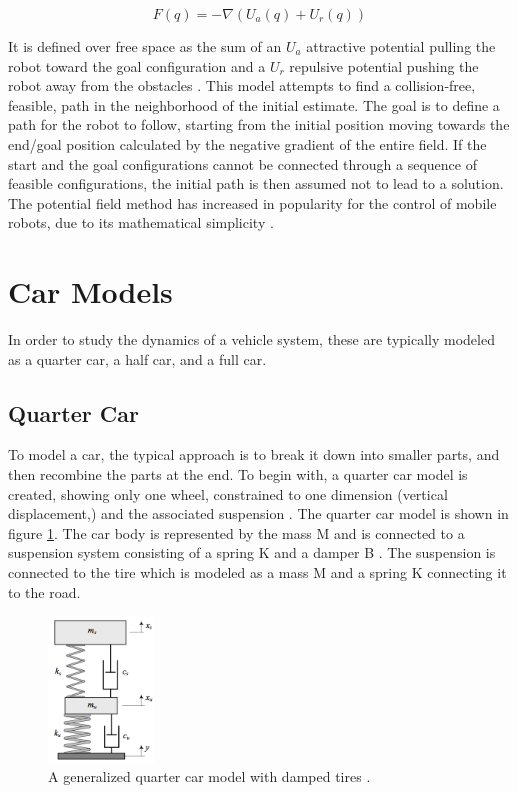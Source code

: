 $$F(q)=-\nabla(U_a(q)+U_r(q))$$

It is defined over free space as the sum of an $U_a$ attractive potential pulling the robot toward the goal configuration and a $U_r$ repulsive potential pushing the robot away from the obstacles \cite{article:potential_fields_convoy}. This model attempts to find a collision-free, feasible, path in the neighborhood of the initial estimate. The goal is to define a path for the robot to follow, starting from the initial position moving towards the end/goal position calculated by the negative gradient of the entire field. If the start and the goal configurations cannot be connected through a sequence of feasible configurations, the initial path is then assumed not to lead to a solution. The potential field method has increased in popularity for the control of mobile robots, due to its mathematical simplicity \cite{article:potential_fields_convoy}.

\section{Car Models}
In order to study the dynamics of a vehicle system, these are typically modeled as a quarter car, a half car, and a full car.

\subsection{Quarter Car}
To model a car, the typical approach is to break it down into smaller parts, and then recombine the parts at the end. To begin with, a quarter car model is created, showing only one wheel, constrained to one dimension (vertical displacement,) and the associated suspension \cite{article:convoy_comm,article:motion_planning_apf}. The quarter car model is shown in figure \ref{fig:quarter_car}. The car body is represented by the mass M and is connected to a suspension system consisting of a spring K and a damper B . The suspension is connected to the tire which is modeled as a mass M and a spring K connecting it to the road.

\begin{figure}[t]
	\centering
	\includegraphics[width=0.25\textwidth]{figures/quarter_car.png}
	\caption{A generalized quarter car model with damped tires \cite{book:jazar}.}
	\label{fig:quarter_car}
\end{figure}

